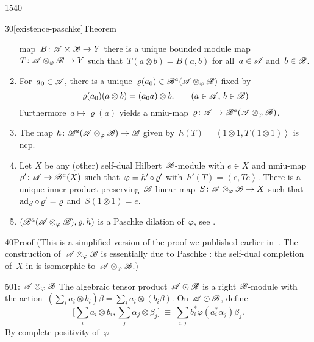 \begin{parsec}{1540}
\begin{point}{30}[existence-paschke]{Theorem}
\begin{enumerate}
    map~$B \colon \mathscr{A} \times \mathscr{B} \to Y$
    there is a unique bounded
    module map~$T\colon \mathscr{A} \otimes_\varphi \mathscr{B} \to Y$
    such that~$T(a \otimes b) = B(a,b)$ for all~$a \in \mathscr{A}$ and~$b \in \mathscr{B}$.
\item
    For~$a_0 \in \mathscr{A}$,
    there is a unique~$\varrho(a_0) \in \mathscr{B}^a(\mathscr{A} \otimes_\varphi \mathscr{B})$
            fixed by
            \begin{equation*}
                \varrho(a_0)(a\otimes b) = (a_0 a)\otimes b.
                    \text{\qquad ($a\in \mathscr{A}$, $b \in \mathscr{B}$)}
            \end{equation*}
    Furthermore~$a \mapsto \varrho(a)$
        yields a
        nmiu-map~$\varrho\colon \mathscr{A} \to \mathscr{B}^a(\mathscr{A}\otimes_\varphi \mathscr{B})$.
\item
    The map
    $h\colon \mathscr{B}^a(\mathscr{A}\otimes_\varphi\mathscr{B}) \to \mathscr{B}$
    given by~$h(T) =\left<1 \otimes 1, T(1 \otimes 1)\right>$
    is ncp.
\item
Let $X$ be any (other) self-dual Hilbert~$\mathscr{B}$-module with $e \in X$ and
        nmiu-map~$\varrho'\colon \mathscr{A} \to \mathscr{B}^a(X)$
        such that~$\varphi  = h' \mathop{\circ} \varrho'$
        with~$h'(T) = \left<e,T e\right>$.
There is a unique
        inner product preserving~$\mathscr{B}$-linear
        map~$S \colon \mathscr{A}\otimes_\varphi\mathscr{B} \to X$
        such that~$\mathrm{ad}_S \mathop{\circ} \varrho' = \varrho$
        and~$S( 1\otimes 1) = e$.
\item
$(\mathscr{B}^a(\mathscr{A} \otimes_\varphi \mathscr{B}), \varrho, h)$
        is a Paschke dilation of~$\varphi$, see .
\end{enumerate}
\begin{point}{40}{Proof}%
(This is a simplified version of the proof
    we published earlier in~\cite{wwpaschke}.
The construction of~$\mathscr{A} \otimes_\varphi \mathscr{B}$
    is essentially due to Paschke \cite[Thm.~5.2]{paschke}:
    the self-dual completion of~$X$ in \cite[Thm.~5.2]{paschke}
    is isomorphic to~$\mathscr{A} \otimes_\varphi \mathscr{B}$.)
\begin{point}{50}{1: $\mathscr{A} \otimes_\varphi \mathscr{B}$}%
The algebraic tensor product~$\mathscr{A} \odot \mathscr{B}$
    is a right $\mathscr{B}$-module
with the action~$(\sum_i a_i \otimes b_i)\beta = \sum_i a_i \otimes(b_i\beta)$.
On~$\mathscr{A} \odot \mathscr{B}$, define
\begin{equation*}
    \bigl[\sum_i a_i \otimes b_i, \sum_j \alpha_j \otimes \beta_j\bigr]
    \ \equiv\  \sum_{i,j} b_i^* \varphi(a_i^*\alpha_j)\beta_j.
\end{equation*}
By complete positivity of~$\varphi$

\end{point}
\end{point}
\end{point}
\end{parsec}
